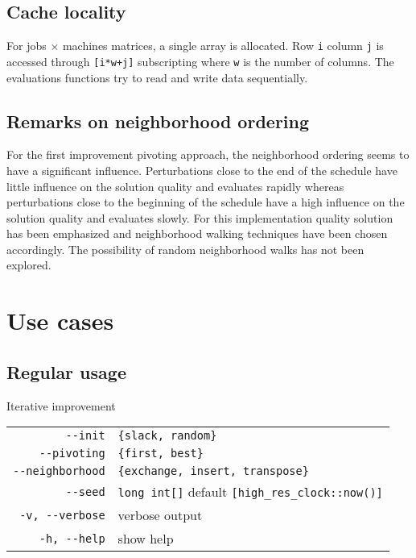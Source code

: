\documentclass[a4paper,12pt]{article}
\begin{document}
\subsection{Cache locality}

For jobs $\times$ machines matrices, a single array is allocated. Row \verb!i! column \verb!j! is accessed through \verb![i*w+j]! subscripting where \verb!w! is the number of columns. The evaluations functions try to read and write data sequentially.

\subsection{Remarks on neighborhood ordering}

For the first improvement pivoting approach, the neighborhood ordering seems to have a significant influence. Perturbations close to the end of the schedule have little influence on the solution quality and evaluates rapidly whereas perturbations close to the beginning of the schedule have a high influence on the solution quality and evaluates slowly. For this implementation quality solution has been emphasized and neighborhood walking techniques have been chosen accordingly. The possibility of random neighborhood walks has not been explored.
\newpage\cleardoublepage{}
\section{Use cases}

\subsection{Regular usage}


Iterative improvement


\begin{tabular}{rl}
\verb!--init! & \verb!{slack, random}!\\
\verb!--pivoting! & \verb!{first, best}!\\
\verb!--neighborhood! & \verb!{exchange, insert, transpose}!\\
\verb!--seed! & \verb!long int[]! default \verb![high_res_clock::now()]!\\
\verb!-v, --verbose! & verbose output\\
\verb!-h, --help! & show help\\
\end{tabular}
\end{document}
